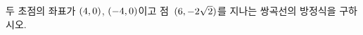두 초점의 좌표가 $(4{,}\mkern3mu\mathopen{}0)$, $(-4{,}\mkern3mu\mathopen{}0)$이고 점~$(6{,}\mkern3mu\mathopen{}-2\sqrt{2})$를 지나는 쌍곡선의 방정식을 구하시오.
